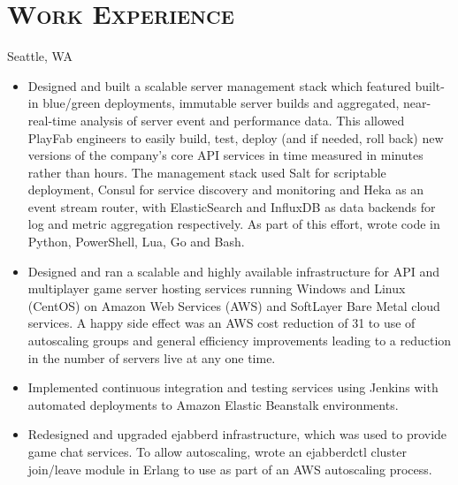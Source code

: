 \documentclass[11pt,letter,roman]{moderncv}
\begin{document}
\section{\textsc{Work Experience}}
{Seattle, WA}{}{%
  \begin{itemize}
    \item Designed and built a scalable server management stack which featured
      built-in blue/green deployments, immutable server builds and aggregated,
      near-real-time analysis of server event and performance data. This
      allowed PlayFab engineers to easily build, test, deploy (and if needed,
      roll back) new versions of the company's core API services in time
      measured in minutes rather than hours. The management stack used Salt for
      scriptable deployment, Consul for service discovery and monitoring and
      Heka as an event stream router, with ElasticSearch and InfluxDB as data
      backends for log and metric aggregation respectively. As part of this
      effort, wrote code in Python, PowerShell, Lua, Go and Bash.
    \item Designed and ran a scalable and highly available infrastructure for
      API and multiplayer game server hosting services running Windows and
      Linux (CentOS) on Amazon Web Services (AWS) and SoftLayer Bare Metal
      cloud services. A happy side effect was an AWS cost reduction of 31%
      to use of autoscaling groups and general efficiency improvements leading
      to a reduction in the number of servers live at any one time.
    \item Implemented continuous integration and testing services using Jenkins
      with automated deployments to Amazon Elastic Beanstalk environments.
    \item Redesigned and upgraded ejabberd infrastructure, which was used to
      provide game chat services. To allow autoscaling, wrote an ejabberdctl
      cluster join/leave module in Erlang to use as part of an AWS autoscaling
      process.
  \end{itemize}
}
\end{document}
